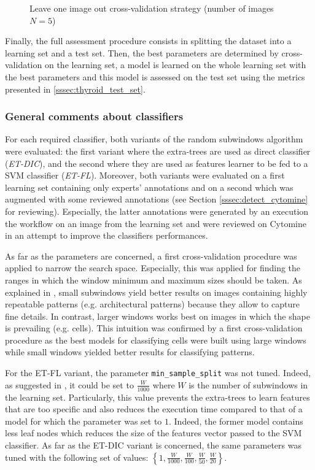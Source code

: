 \begin{figure}
	\center
	\caption{Leave one image out cross-validation strategy (number of images $N = 5$)}
	\label{fig:loio}
\end{figure}

Finally, the full assessment procedure consists in splitting the dataset into a learning set and a test set. Then, the best parameters are determined by cross-validation on the learning set, a model is learned on the whole learning set with the best parameters and this model is assessed on the test set using the metrics presented in \ref{sssec:thyroid_test_set}.

\subsubsection{General comments about classifiers}
\label{sssec:general_classif}
For each required classifier, both variants of the random subwindows algorithm were evaluated: the first variant where the extra-trees are used as direct classifier (\textit{ET-DIC}), and the second where they are used as features learner to be fed to a SVM classifier (\textit{ET-FL}). Moreover, both variants were evaluated on a first learning set containing only experts' annotations and on a second which was augmented with some reviewed annotations (see Section \ref{sssec:detect_cytomine} for reviewing). Especially, the latter annotations were generated by an execution the workflow on an image from the learning set and  were reviewed on Cytomine in an attempt to improve the classifiers performances. 

As far as the parameters are concerned, a first cross-validation procedure was applied to narrow the search space. Especially, this was applied for finding the ranges in which the window minimum and maximum sizes should be taken. As explained in \cite{Maree201617}, small subwindows yield better results on images containing highly repeatable patterns (e.g. architectural patterns) because they allow to capture fine details. In contrast, larger windows works best on images in which the shape is prevailing (e.g. cells). This intuition was confirmed by a first cross-validation procedure as the best models for classifying cells were built using large windows while small windows yielded better results for classifying patterns.

For the ET-FL variant, the parameter \texttt{min\_sample\_split} was not tuned. Indeed, as suggested in \cite{Maree201617}, it could be set to $\frac{W}{1000}$ where $W$ is the number of subwindows in the learning set. Particularly, this value prevents the extra-trees to learn features that are too specific and also reduces the execution time compared to that of a model for which the parameter was set to $1$. Indeed, the former model contains less leaf nodes which reduces the size of the features vector passed to the SVM classifier. As far as the ET-DIC variant is concerned, the same parameters was tuned with the following set of values: $\left\{1, \frac{W}{1000}, \frac{W}{100}, \frac{W}{50}, \frac{W}{20} \right\}$.

